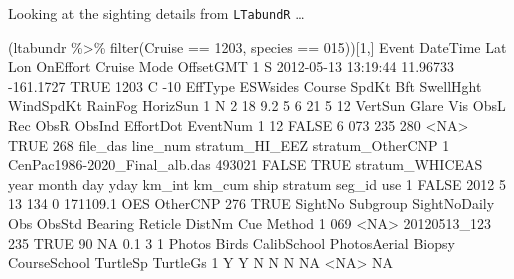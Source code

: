 \documentclass[
]{book}
\newenvironment{Shaded}{\begin{snugshade}}{\end{snugshade}}
\newcommand{\ConstantTok}[1]{\textcolor[rgb]{0.00,0.00,0.00}{#1}}
\newcommand{\DecValTok}[1]{\textcolor[rgb]{0.00,0.00,0.81}{#1}}
\newcommand{\FloatTok}[1]{\textcolor[rgb]{0.00,0.00,0.81}{#1}}
\newcommand{\FunctionTok}[1]{\textcolor[rgb]{0.00,0.00,0.00}{#1}}
\newcommand{\NormalTok}[1]{#1}
\newcommand{\SpecialCharTok}[1]{\textcolor[rgb]{0.00,0.00,0.00}{#1}}
\newcommand{\StringTok}[1]{\textcolor[rgb]{0.31,0.60,0.02}{#1}}
\begin{document}
Looking at the sighting details from \texttt{LTabundR} \ldots{}

\begin{Shaded}
\begin{Highlighting}[]
\NormalTok{(ltabundr }\SpecialCharTok{\%\textgreater{}\%} \FunctionTok{filter}\NormalTok{(Cruise }\SpecialCharTok{==} \DecValTok{1203}\NormalTok{, species }\SpecialCharTok{==} \StringTok{\textquotesingle{}015\textquotesingle{}}\NormalTok{))[}\DecValTok{1}\NormalTok{,]}
\NormalTok{  Event            DateTime      Lat       Lon OnEffort Cruise Mode OffsetGMT}
\DecValTok{1}\NormalTok{     S }\DecValTok{2012{-}05{-}13} \DecValTok{13}\SpecialCharTok{:}\DecValTok{19}\SpecialCharTok{:}\DecValTok{44} \FloatTok{11.96733} \SpecialCharTok{{-}}\FloatTok{161.1727}     \ConstantTok{TRUE}   \DecValTok{1203}\NormalTok{    C       }\SpecialCharTok{{-}}\DecValTok{10}
\NormalTok{  EffType ESWsides Course SpdKt Bft SwellHght WindSpdKt RainFog HorizSun}
\DecValTok{1}\NormalTok{       N        }\DecValTok{2}     \DecValTok{18}   \FloatTok{9.2}   \DecValTok{5}         \DecValTok{6}        \DecValTok{21}       \DecValTok{5}       \DecValTok{12}
\NormalTok{  VertSun Glare Vis ObsL Rec ObsR ObsInd EffortDot EventNum}
\DecValTok{1}      \DecValTok{12} \ConstantTok{FALSE}   \DecValTok{6}  \DecValTok{073} \DecValTok{235}  \DecValTok{280}   \SpecialCharTok{\textless{}}\ConstantTok{NA}\SpecialCharTok{\textgreater{}}      \ConstantTok{TRUE}      \DecValTok{268}
\NormalTok{                       file\_das line\_num stratum\_HI\_EEZ stratum\_OtherCNP}
\DecValTok{1}\NormalTok{ CenPac1986}\SpecialCharTok{{-}}\NormalTok{2020\_Final\_alb.das   }\DecValTok{493021}          \ConstantTok{FALSE}             \ConstantTok{TRUE}
\NormalTok{  stratum\_WHICEAS year month day yday km\_int   km\_cum ship  stratum seg\_id  use}
\DecValTok{1}           \ConstantTok{FALSE} \DecValTok{2012}     \DecValTok{5}  \DecValTok{13}  \DecValTok{134}      \DecValTok{0} \FloatTok{171109.1}\NormalTok{  OES OtherCNP    }\DecValTok{276} \ConstantTok{TRUE}
\NormalTok{  SightNo Subgroup SightNoDaily Obs ObsStd Bearing Reticle DistNm Cue Method}
\DecValTok{1}     \DecValTok{069}     \SpecialCharTok{\textless{}}\ConstantTok{NA}\SpecialCharTok{\textgreater{}}\NormalTok{ 20120513\_123 }\DecValTok{235}   \ConstantTok{TRUE}      \DecValTok{90}      \ConstantTok{NA}    \FloatTok{0.1}   \DecValTok{3}      \DecValTok{1}
\NormalTok{  Photos Birds CalibSchool PhotosAerial Biopsy CourseSchool TurtleSp TurtleGs}
\DecValTok{1}\NormalTok{      Y     Y           N            N      N           }\ConstantTok{NA}     \SpecialCharTok{\textless{}}\ConstantTok{NA}\SpecialCharTok{\textgreater{}}       \ConstantTok{NA}

\end{Highlighting}
\end{Shaded}
\end{document}
